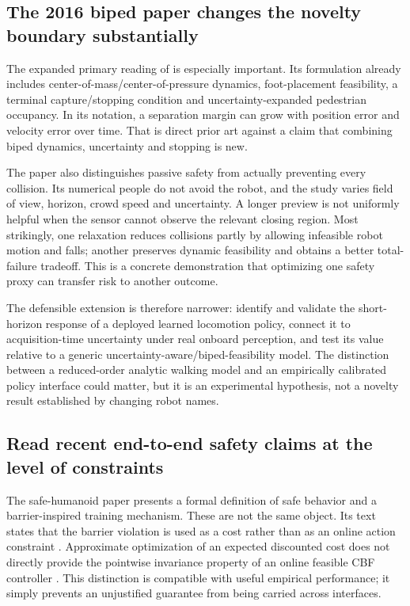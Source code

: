 \subsection{The 2016 biped paper changes the novelty boundary substantially}
The expanded primary reading of \citet{biped2016} is especially important.
Its formulation already includes center-of-mass/center-of-pressure dynamics,
foot-placement feasibility, a terminal capture/stopping condition and
uncertainty-expanded pedestrian occupancy. In its notation, a separation margin
can grow with position error and velocity error over time. That is direct prior
art against a claim that combining biped dynamics, uncertainty and stopping is
new.

The paper also distinguishes passive safety from actually preventing every
collision. Its numerical people do not avoid the robot, and the study varies
field of view, horizon, crowd speed and uncertainty. A longer preview is not
uniformly helpful when the sensor cannot observe the relevant closing region.
Most strikingly, one relaxation reduces collisions partly by allowing infeasible
robot motion and falls; another preserves dynamic feasibility and obtains a
better total-failure tradeoff. This is a concrete demonstration that optimizing
one safety proxy can transfer risk to another outcome.

The defensible extension is therefore narrower: identify and validate the
short-horizon response of a deployed learned locomotion policy, connect it to
acquisition-time uncertainty under real onboard perception, and test its value
relative to a generic uncertainty-aware/biped-feasibility model. The distinction
between a reduced-order analytic walking model and an empirically calibrated
policy interface could matter, but it is an experimental hypothesis, not a
novelty result established by changing robot names.

\subsection{Read recent end-to-end safety claims at the level of constraints}
The safe-humanoid paper presents a formal definition of safe behavior and a
barrier-inspired training mechanism. These are not the same object. Its text
states that the barrier violation is used as a cost rather than as an online
action constraint \citep{safehumanoid}. Approximate optimization of an expected
discounted cost does not directly provide the pointwise invariance property of
an online feasible CBF controller \citep{cbf,safecontrol}. This distinction is
compatible with useful empirical performance; it simply prevents an unjustified
guarantee from being carried across interfaces.

